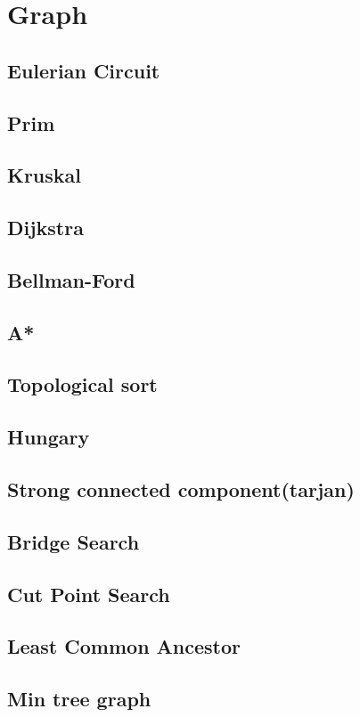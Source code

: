 \newpage
\section{Graph}

\subsection{Eulerian Circuit}


\subsection{Prim}


\subsection{Kruskal}


\subsection{Dijkstra}


\subsection{Bellman-Ford}


\subsection{A*}
\subsection{Topological sort}


\subsection{Hungary}


\subsection{Strong connected component(tarjan)}


\subsection{Bridge Search}


\subsection{Cut Point Search}


\subsection{Least Common Ancestor}


\subsection{Min tree graph}
